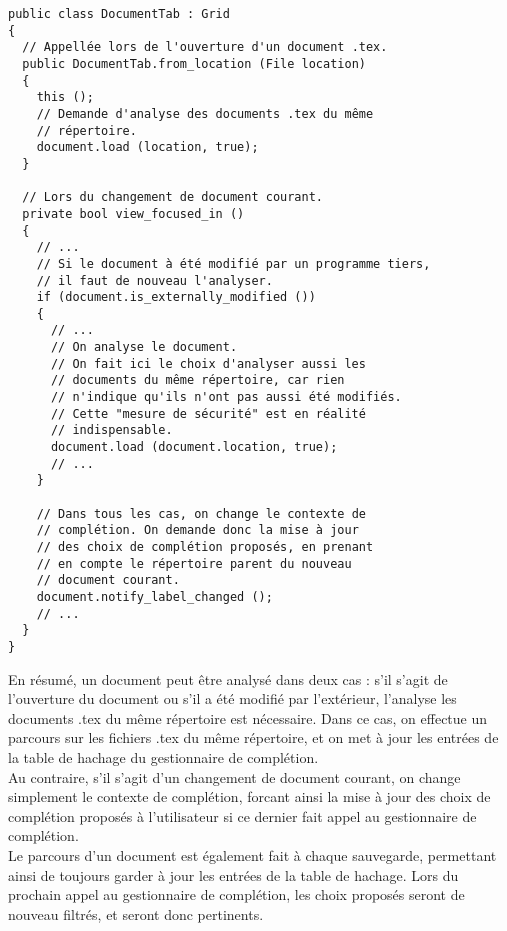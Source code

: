 \documentclass[a4paper,11pt]{report}
\begin{document}
\begin{lstlisting}[frame=single]
public class DocumentTab : Grid
{
  // Appellée lors de l'ouverture d'un document .tex.
  public DocumentTab.from_location (File location)
  {
    this ();
    // Demande d'analyse des documents .tex du même
    // répertoire.
    document.load (location, true);
  }
  
  // Lors du changement de document courant.
  private bool view_focused_in ()
  {
    // ...
    // Si le document à été modifié par un programme tiers,
    // il faut de nouveau l'analyser.
    if (document.is_externally_modified ())
    {
      // ...
      // On analyse le document.
      // On fait ici le choix d'analyser aussi les
      // documents du même répertoire, car rien
      // n'indique qu'ils n'ont pas aussi été modifiés.
      // Cette "mesure de sécurité" est en réalité
      // indispensable.
      document.load (document.location, true);
      // ...
    }

    // Dans tous les cas, on change le contexte de
    // complétion. On demande donc la mise à jour
    // des choix de complétion proposés, en prenant
    // en compte le répertoire parent du nouveau
    // document courant.
    document.notify_label_changed ();
    // ...
  }
}
\end{lstlisting}

En résumé, un document peut être analysé dans deux cas : s'il s'agit de l'ouverture du document ou s'il a été modifié par l'extérieur, l'analyse les documents .tex du même répertoire est nécessaire.
Dans ce cas, on effectue un parcours sur les fichiers .tex du même répertoire, et on met à jour les entrées de la table de hachage du gestionnaire de complétion.
\\Au contraire, s'il s'agit d'un changement de document courant, on change simplement le contexte de complétion, forcant ainsi la mise à jour des choix de complétion proposés à l'utilisateur si ce dernier fait appel au gestionnaire de complétion.
\\Le parcours d'un document est également fait à chaque sauvegarde, permettant ainsi de toujours garder à jour les entrées de la table de hachage. Lors du prochain appel au gestionnaire de complétion, les choix proposés seront de nouveau filtrés, et seront donc pertinents.
\end{document}
